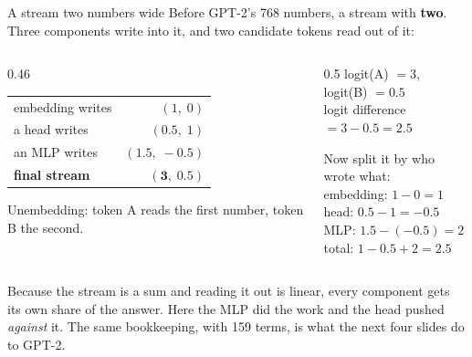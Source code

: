 \documentclass[aspectratio=169]{beamer}
\newcommand{\keybox}[1]{%
  \begin{tcolorbox}[colback=armblue!8, colframe=armblue, boxrule=0.6pt, arc=2pt]
  #1
  \end{tcolorbox}}
\begin{document}
\begin{frame}{A stream two numbers wide}
  \vspace{0.2em}
  Before GPT-2's 768 numbers, a stream with \textbf{two}. Three components write into it, and
  two candidate tokens read out of it:

  \vspace{0.5em}
  \begin{columns}[T]
    \begin{column}{0.46\textwidth}
      \small
      \begin{tabular}{@{}lr@{}}
        \toprule
        embedding writes & $(1,\; 0)$\\
        a head writes & $(0.5,\; 1)$\\
        an MLP writes & $(1.5,\; -0.5)$\\
        \midrule
        \textbf{final stream} & $\mathbf{(3,\; 0.5)}$\\
        \bottomrule
      \end{tabular}

      \vspace{0.6em}
      Unembedding: token A reads the first number, token B the second.
    \end{column}
    \begin{column}{0.5\textwidth}
      \small
      logit(A) $= 3$, \quad logit(B) $= 0.5$\\[0.3em]
      logit difference $= 3 - 0.5 = \mathbf{2.5}$

      \vspace{0.6em}
      Now split it by who wrote what:\\[0.3em]
      embedding: $1 - 0 = 1$\\
      head: $0.5 - 1 = -0.5$\\
      MLP: $1.5 - (-0.5) = 2$\\[0.3em]
      total: $1 - 0.5 + 2 = \mathbf{2.5}$ \textcolor{paramgreen}{}
    \end{column}
  \end{columns}

  \vspace{0.7em}
  \keybox{\small Because the stream is a sum and reading it out is linear, every component gets its
  own share of the answer. Here the MLP did the work and the head pushed \emph{against} it. The
  same bookkeeping, with 159 terms, is what the next four slides do to GPT-2.}
\end{frame}
\end{document}

